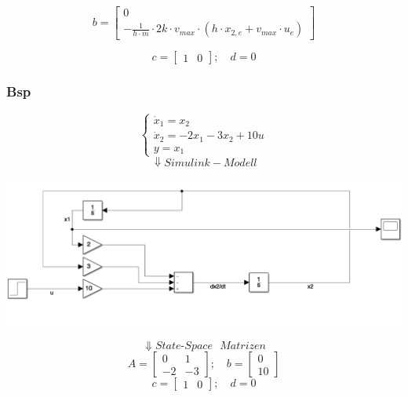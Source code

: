             \[ b = \begin{bmatrix} 0 \\ -\frac{1}{h\cdot m} \cdot 2k \cdot v_{max} \cdot (h\cdot x_{2,e} + v_{max} \cdot u_e) \end{bmatrix}\]
             
             \[ c = \begin{bmatrix} 1 & 0 \end{bmatrix}; \quad d = 0\]

    \subsubsection{Bsp}
            \[\begin{cases}
            \dot{x}_1=x_2\\
            \dot{x}_2=-2x_1-3x_2+10u\\
            y= x_1
            \end{cases}
            \]
        \[\Downarrow{Simulink-Modell}\]
        \begin{center}
            \includegraphics[width=0.8\linewidth]{images/02/simulink.jpeg}
        \end{center}
        \[\Downarrow{State\textrm{-}Space\textrm{ }Matrizen}\]
        \[A= \begin{bmatrix}
            0 & 1 \\ -2 & -3
        \end{bmatrix};\quad b=
        \begin{bmatrix}
        0\\10
        \end{bmatrix}
        \]
        \[c=\begin{bmatrix}
        1 & 0
        \end{bmatrix};\quad d=0\]
        
        